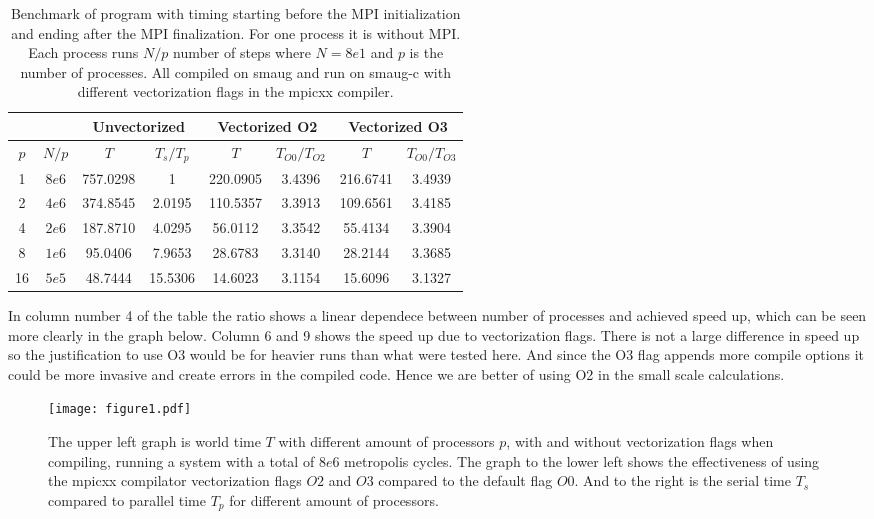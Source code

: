 %

\begin{table}
  \centering
  \begin{tabular}{cc|cc|cc|cc}
    &&\multicolumn{2}{c}{Unvectorized} & \multicolumn{2}{c}{Vectorized O2} &%
    \multicolumn{2}{c}{Vectorized O3}\\\hline
    $p$ & $N/p$ & $T $     & $T_{s}/T_{p}$ & $T$       & $T_{O0}/T_{O2}$ & $T$      & $T_{O0}/T_{O3}$ \\\hline
    1   & $8e6$ & 757.0298 &  1            & 220.0905  & 3.4396          & 216.6741 & 3.4939 \\
    2   & $4e6$ & 374.8545 &  2.0195       & 110.5357  & 3.3913          & 109.6561 & 3.4185 \\  
    4   & $2e6$ & 187.8710 &  4.0295       &  56.0112  & 3.3542          &  55.4134 & 3.3904 \\
    8   & $1e6$ &  95.0406 &  7.9653       &  28.6783  & 3.3140          &  28.2144 & 3.3685 \\
    16  & $5e5$ &  48.7444 & 15.5306       &  14.6023  & 3.1154          &  15.6096 & 3.1327 
  \end{tabular}
  \caption{%
           Benchmark of program with timing starting before the MPI initialization %
           and ending after the MPI finalization. For one process it is without %
           MPI. Each process runs $N/p$ number of steps where $N=8e1$ and $p$ is %
           the number of processes. %
           All compiled on smaug and run on smaug-c with different vectorization %
           flags in the mpicxx compiler. %
         }
\end{table}
In column number 4 of the table the ratio shows a linear dependece between 
number of processes and achieved speed up, which can be seen more clearly 
in the graph below. Column 6 and 9 shows the speed up due to vectorization flags.
There is not a large difference in speed up so the justification to use O3 would 
be for heavier runs than what were tested here. And since the O3 flag appends
more compile options it could be more invasive and create errors in the compiled
code. Hence we are better of using O2 in the small scale calculations.

\begin{figure}[h!]
  \centering
  \texttt{[image: figure1.pdf]}
  \caption{%
           The upper left graph is world time $T$ with different amount of processors $p$, %
           with and without vectorization flags when compiling, running a system with %
           a total of $8e6$ metropolis cycles. The graph to the lower left shows the %
           effectiveness of using the mpicxx compilator vectorization flags $O2$ and %
           $O3$ compared to the default flag $O0$. And to the right is the serial time %
           $T_s$ compared to parallel time $T_p$ for different amount of processors. %
         }
\end{figure}

